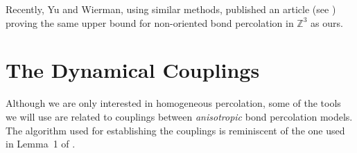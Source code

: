 \documentclass{aptpub}
\newcommand{\Z}{\mathbb{Z}}
\begin{document}

\begin{rem} Recently, Yu and Wierman, using similar methods, published an article (see \cite{YW}) proving the same upper bound for non-oriented bond percolation in $\Z^3$ as ours.
\end{rem}






\section{The Dynamical Couplings}\label{sec:couplings}



Although we are only interested in homogeneous percolation, some of the tools we will use are related to couplings between {\it anisotropic} bond percolation models. The algorithm used for establishing the couplings is reminiscent of the one used in Lemma~1 of \cite{GM}.
\end{document}

